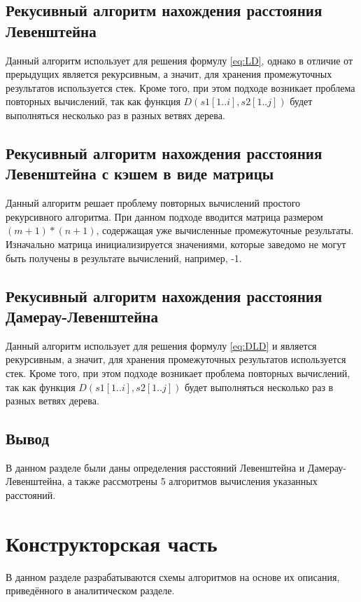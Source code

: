 \documentclass{report}
\begin{document}
\section{Рекусивный алгоритм нахождения расстояния Левенштейна}\label{rd}
Данный алгоритм использует для решения формулу \ref{eq:LD}, однако в отличие от прерыдущих является рекурсивным, а значит, для хранения промежуточных результатов используется стек. Кроме того, при этом подходе возникает проблема повторных вычислений, так как функция $D(s1[1..i], s2[1..j])$ будет выполняться несколько раз в разных ветвях дерева.

\section{Рекусивный алгоритм нахождения расстояния Левенштейна с кэшем в виде матрицы}

Данный алгоритм решает проблему повторных вычислений простого рекурсивного алгоритма. При данном подходе вводится матрица размером $(m + 1) * (n + 1)$, содержащая уже вычисленные промежуточные результаты. Изначально матрица инициализируется значениями, которые заведомо не могут быть получены в результате вычислений, например, -1.


\section{Рекусивный алгоритм нахождения расстояния Дамерау-Левенштейна}

Данный алгоритм использует для решения формулу \ref{eq:DLD} и является рекурсивным, а значит, для хранения промежуточных результатов используется стек. Кроме того, при этом подходе возникает проблема повторных вычислений, так как функция $D(s1[1..i], s2[1..j])$ будет выполняться несколько раз в разных ветвях дерева.

\section{Вывод}

В данном разделе были даны определения расстояний Левенштейна и Дамерау-Левенштейна, а также рассмотрены 5 алгоритмов вычисления указанных расстояний.
	
\clearpage

\chapter{Конструкторская часть}
В данном разделе разрабатываются схемы алгоритмов на основе их описания, приведённого в аналитическом разделе.
\end{document}
